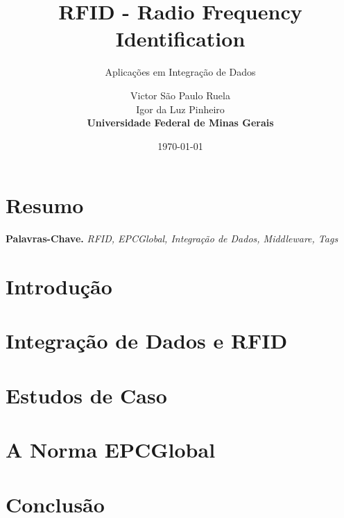 \documentclass[a4paper,12pt,titlepage]{scrartcl}
\begin{document}
\title{RFID - Radio Frequency Identification}
\subtitle{Aplicações em Integração de Dados}
\author{Victor São Paulo Ruela \\ Igor da Luz Pinheiro \\ \textbf{Universidade Federal de Minas Gerais}}
\date{\today}

\maketitle

\tableofcontents
\newpage 
\listoffigures
\newpage
\listoftables
\newpage

\section*{Resumo}


\smallskip
\noindent \textbf{Palavras-Chave.} \textit{RFID, EPCGlobal, Integração de Dados, Middleware, Tags	}

\section{Introdução}

\section{Integração de Dados e RFID}

\section{Estudos de Caso}

\section{A Norma EPCGlobal}

\section{Conclusão}


\newpage

\nocite{*}

\end{document}
